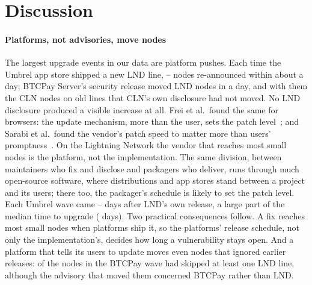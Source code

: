 \section{Discussion}
\label{sec:discussion}

\paragraph{Platforms, not advisories, move nodes}
The largest upgrade events in our data are platform pushes. Each time the Umbrel app store shipped a new
LND line, \WaveUmbrelMinNodes--\WaveUmbrelMaxNodes{} nodes re-announced within about a day; BTCPay Server's security
release moved \WaveBTCPayNodes{} LND nodes in a day, and with them the CLN nodes on old lines that CLN's own
disclosure had not moved. No LND disclosure produced a visible increase at all. Frei et al.\ found the same for browsers:
the update mechanism, more than the user, sets the patch level~\cite{frei2009firefox}; and Sarabi et al.\ found the
vendor's patch speed to matter more than users' promptness~\cite{sarabi2017patchme}. On the Lightning Network the
vendor that reaches most small nodes is the platform, not the implementation. The same division, between maintainers
who fix and disclose and packagers who deliver, runs through much open-source software, where distributions and app
stores stand between a project and its users; there too, the packager's schedule is likely to set the patch level.
Each Umbrel wave came
\WaveUmbrelDaysMin--\WaveUmbrelDaysMax{} days after LND's own release, a large part of the median time to upgrade
(\MedianLNDAll{} days). Two practical consequences follow. A fix reaches most small nodes when platforms ship it, so
the platforms' release schedule, not only the implementation's, decides how long a vulnerability stays open. And a
platform that tells its users to update moves even nodes that ignored earlier releases: \WaveBTCPayOlder{} of the
\WaveBTCPayNodes{} nodes in the BTCPay wave had skipped at least one LND line, although the advisory that moved them
concerned BTCPay rather than LND.

